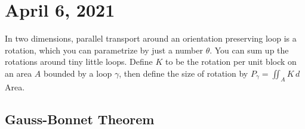 \section{April 6, 2021}
In two dimensions, parallel transport around an orientation preserving loop is a rotation, which you can parametrize by just a number $\theta$. You can sum up the rotations around tiny little loops. Define $K$ to be the rotation per unit block on an area $A$ bounded by a loop $\gamma $, then define the size of rotation by $P_{\gamma }=\iint_A K\, d$Area. 
\subsection{Gauss-Bonnet Theorem}

